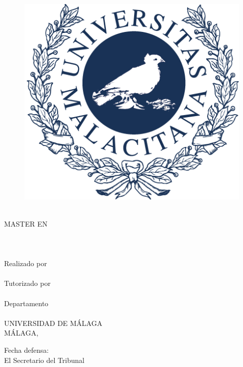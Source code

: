 \begin{center}
  \begin{figure}[h]
    \centering
    \includegraphics[scale=0.2]{images/marcauma.png}
  \end{figure}

  \MakeUppercase{\facultad} \\
  \bigbreak
  MASTER EN \MakeUppercase{\grado} \\
  \MakeUppercase{\especialidad}\\
  \vspace{2cm}
  {\large	\textbf{\tituloes}} \\
  \ifdef{\subtituloes}{
    \textit{\subtituloes} \\
  }{}
  {\large	\textbf{\tituloen}} \\
  \ifdef{\subtituloen}{
    \textit{\subtituloen} \\
  }{}
    \vspace{2cm}
  Realizado por \\
  \textbf{\alumno} \\
  Tutorizado por \\
  \textbf{\tutor} \\
  Departamento \\
  \textbf{\departamento} \\
    \vspace{2cm}
  UNIVERSIDAD DE MÁLAGA \\
  MÁLAGA, \fecha
\end{center}

\vfill

Fecha defensa: \\
El Secretario del Tribunal
